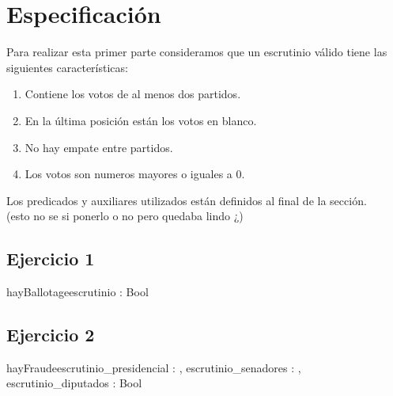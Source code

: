 \documentclass[10pt,a4paper]{article}
\begin{document}
\section{Especificación}
Para realizar esta primer parte consideramos que un escrutinio válido tiene las siguientes características:
\begin{enumerate} \setlength\itemsep{0cm}
	\item Contiene los votos de al menos dos partidos.
	\item En la última posición están los votos en blanco.
	\item No hay empate entre partidos.
	\item Los votos son numeros mayores o iguales a 0.
\end{enumerate}

Los predicados y auxiliares utilizados están definidos al final de la sección. \\

(esto no se si ponerlo o no pero quedaba lindo ¿) 

\subsection{Ejercicio 1}

\begin{proc}{hayBallotage}{\In escrutinio : \TLista{\ent}}{Bool}
\end{proc}

\subsection{Ejercicio 2}

\begin{proc}{hayFraude}{\In escrutinio\_presidencial : \TLista{\ent}, \In escrutinio\_senadores : \TLista{\ent}, \In escrutinio\_diputados : \TLista{\ent}}{Bool}
\end{proc}
\end{document}

